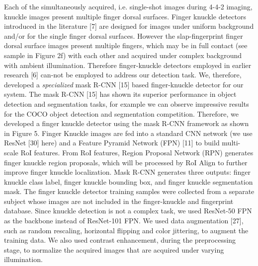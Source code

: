 Each of the simultaneously acquired, i.e. single-shot images during 4-4-2 imaging, knuckle images present multiple finger dorsal surfaces. Finger knuckle detectors introduced in the literature [7] are designed for images under uniform background and/or for the single finger dorsal surfaces. However the slap-fingerprint finger dorsal surface images present multiple fingers, which may be in full contact (see sample in Figure 2f) with each other and acquired under complex background with ambient illumination. Therefore finger-knuckle detectors employed in earlier research [6] can-not be employed to address our detection task. We, therefore, developed a \textit{specialized} mask R-CNN [15] based finger-knuckle detector for our system. The mask R-CNN [15] has shown its superior performance in object detection and segmentation tasks, for example we can observe impressive results for the COCO object detection and segmentation competition. Therefore, we developed a finger knuckle detector using the mask R-CNN framework as shown in Figure 5. Finger Knuckle images are fed into a standard CNN network (we use ResNet [30] here) and a Feature Pyramid Network (FPN) [11] to build multi-scale RoI features. From RoI features, Region Proposal Network (RPN) generates finger knuckle region proposals, which will be processed by RoI Align to further improve finger knuckle localization. Mask R-CNN generates three outputs: finger knuckle class label, finger knuckle bounding box, and finger knuckle segmentation mask. The finger knuckle detector training samples were collected from a separate subject whose images are not included in the finger-knuckle and fingerprint database. Since knuckle detection is not a complex task, we used ResNet-50 FPN as the backbone instead of ResNet-101 FPN. We used data augmentation [27], such as random rescaling, horizontal flipping and color jittering, to augment the training data. We also used contrast enhancement, during the preprocessing stage, to normalize the acquired images that are acquired under varying illumination.  

